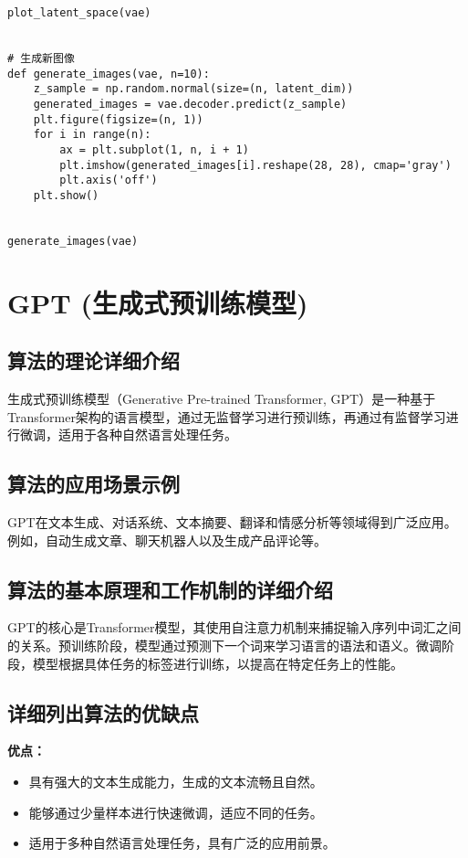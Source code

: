 \begin{lstlisting}
plot_latent_space(vae)


# 生成新图像
def generate_images(vae, n=10):
    z_sample = np.random.normal(size=(n, latent_dim))
    generated_images = vae.decoder.predict(z_sample)
    plt.figure(figsize=(n, 1))
    for i in range(n):
        ax = plt.subplot(1, n, i + 1)
        plt.imshow(generated_images[i].reshape(28, 28), cmap='gray')
        plt.axis('off')
    plt.show()


generate_images(vae)

\end{lstlisting}


\section{GPT (生成式预训练模型)}
\subsection*{算法的理论详细介绍}
生成式预训练模型（Generative Pre-trained Transformer, GPT）是一种基于Transformer架构的语言模型，通过无监督学习进行预训练，再通过有监督学习进行微调，适用于各种自然语言处理任务。

\subsection*{算法的应用场景示例}
GPT在文本生成、对话系统、文本摘要、翻译和情感分析等领域得到广泛应用。例如，自动生成文章、聊天机器人以及生成产品评论等。

\subsection*{算法的基本原理和工作机制的详细介绍}
GPT的核心是Transformer模型，其使用自注意力机制来捕捉输入序列中词汇之间的关系。预训练阶段，模型通过预测下一个词来学习语言的语法和语义。微调阶段，模型根据具体任务的标签进行训练，以提高在特定任务上的性能。

\subsection*{详细列出算法的优缺点}
\textbf{优点：}
\begin{itemize}
    \item 具有强大的文本生成能力，生成的文本流畅且自然。
    \item 能够通过少量样本进行快速微调，适应不同的任务。
    \item 适用于多种自然语言处理任务，具有广泛的应用前景。
\end{itemize}

